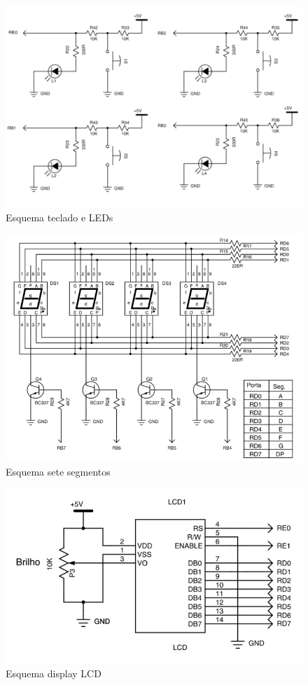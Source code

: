 \documentclass{article}
\begin{document}
\begin{figure}[H]
	\centering
	\includegraphics[width=0.7\linewidth]{esq_ledswi}
	\caption{Esquema teclado e LEDs}
	\label{fig:esq_ledswi}
\end{figure}
\begin{figure}[H]
	\centering
	\includegraphics[width=0.9\linewidth]{esq_7seg}
	\caption{Esquema sete segmentos}
	\label{fig:esq_7seg}
\end{figure}
\begin{figure}[H]
	\centering
	\includegraphics[width=0.9\linewidth]{esq_lcd}
	\caption{Esquema display LCD}
	\label{fig:esq_lcd}
\end{figure}
\end{document}
